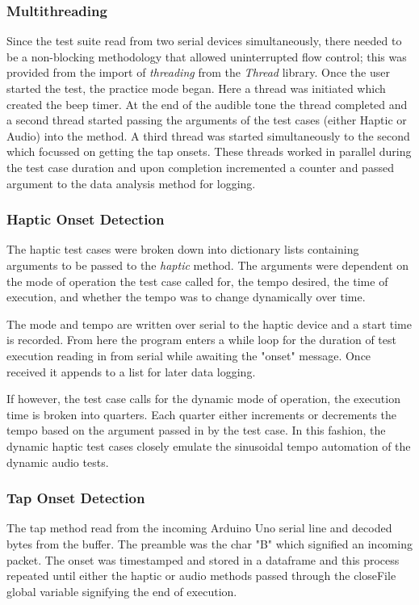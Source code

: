 \subsubsection{Multithreading}
Since the test suite read from two serial devices simultaneously, there needed to be a non-blocking methodology that allowed uninterrupted flow control; this was provided from the import of \textit{threading} from the \textit{Thread} library. Once the user started the test, the practice mode began. Here a thread was initiated which created the beep timer. At the end of the audible tone the thread completed and a second thread started passing the arguments of the test cases (either Haptic or Audio) into the method. A third thread was started simultaneously to the second which focussed on getting the tap onsets. These threads worked in parallel during the test case duration and upon completion incremented a counter and passed argument to the data analysis method for logging.
\subsubsection{Haptic Onset Detection}
The haptic test cases were broken down into dictionary lists containing arguments to be passed to the \textit{haptic} method. The arguments were dependent on the mode of operation the test case called for, the tempo desired, the time of execution, and whether the tempo was to change dynamically over time.

The mode and tempo are written over serial to the haptic device and a start time is recorded. From here the program enters a while loop for the duration of test execution reading in from serial while awaiting the "onset" message. Once received it appends to a list for later data logging.

If however, the test case calls for the dynamic mode of operation, the execution time is broken into quarters. Each quarter either increments or decrements the tempo based on the argument passed in by the test case. In this fashion, the dynamic haptic test cases closely emulate the sinusoidal tempo automation of the dynamic audio tests.
\subsubsection{Tap Onset Detection}
The tap method read from the incoming Arduino Uno serial line and decoded bytes from the buffer. The preamble was the char "B" which signified an incoming packet. The onset was timestamped and stored in a dataframe and this process repeated until either the haptic or audio methods passed through the closeFile global variable signifying the end of execution.
